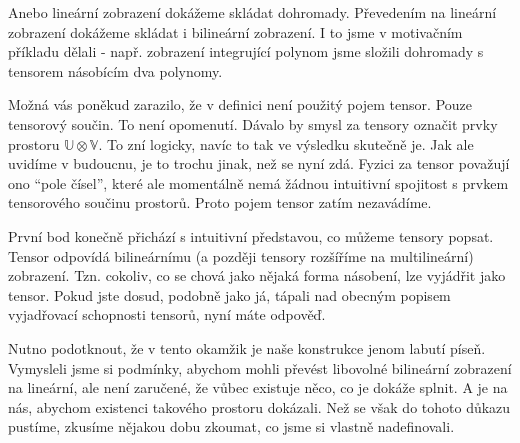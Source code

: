 \documentclass[a5paper,12pt]{amsbook}
\theoremstyle{definition}
\newcommand{\myspace}[1]{\mathbb{#1}}
\begin{document}
Anebo lineární zobrazení dokážeme skládat dohromady. Převedením na lineární zobrazení dokážeme
skládat i bilineární zobrazení. I to jsme v motivačním příkladu dělali - např. zobrazení integrující
polynom jsme složili dohromady s tensorem násobícím dva polynomy.

Možná vás poněkud zarazilo, že v definici není použitý pojem tensor. Pouze tensorový součin.
To není opomenutí. Dávalo by smysl za tensory označit prvky prostoru
$\myspace{U}\otimes\myspace{V}$. To zní logicky, navíc to tak ve výsledku skutečně
je. Jak ale uvidíme v budoucnu, je to trochu jinak, než se nyní zdá. Fyzici za tensor
považují ono ``pole čísel'', které ale momentálně nemá žádnou intuitivní spojitost
s prvkem tensorového součinu prostorů. Proto pojem tensor zatím nezavádíme.

První bod konečně přichází s intuitivní představou, co můžeme tensory popsat. Tensor odpovídá
bilineárnímu (a později tensory rozšíříme na multilineární) zobrazení. Tzn. cokoliv, co se
chová jako nějaká forma násobení, lze vyjádřit jako tensor. Pokud jste dosud, podobně jako já,
tápali nad obecným popisem vyjadřovací schopnosti tensorů, nyní máte odpověď.

Nutno podotknout, že v tento okamžik je naše konstrukce jenom labutí píseň. Vymysleli jsme si
podmínky, abychom mohli převést libovolné bilineární zobrazení na lineární, ale není zaručené,
že vůbec existuje něco, co je dokáže splnit. A je na nás, abychom existenci takového prostoru
dokázali. Než se však do tohoto důkazu pustíme, zkusíme nějakou dobu zkoumat, co jsme si
vlastně nadefinovali.
\end{document}
